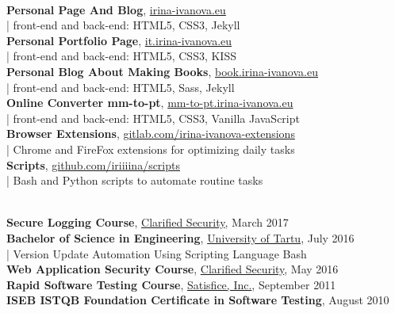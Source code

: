\documentclass[a4paper, 12pt]{article}
\begin{document}
\\
\textbf{Personal Page And Blog}, \href{https://irina-ivanova.eu}{irina-ivanova.eu}\\
\indent | front-end and back-end: HTML5, CSS3, Jekyll\\
\textbf{Personal Portfolio Page}, \href{https://it.irina-ivanova.eu}{it.irina-ivanova.eu}\\
\indent | front-end and back-end: HTML5, CSS3, KISS\\
\textbf{Personal Blog About Making Books}, \href{https://book.irina-ivanova.eu}{book.irina-ivanova.eu}\\
\indent | front-end and back-end: HTML5, Sass, Jekyll\\
\textbf{Online Converter mm-to-pt}, \href{https://mm-to-pt.irina-ivanova.eu}{mm-to-pt.irina-ivanova.eu}\\
\indent | front-end and back-end: HTML5, CSS3, Vanilla JavaScript\\
\textbf{Browser Extensions}, \href{https://gitlab.com/irina-ivanova-extensions}{gitlab.com/irina-ivanova-extensions}\\
\indent | Chrome and FireFox extensions for optimizing daily tasks\\
\textbf{Scripts}, \href{https://github.com/iriiiina/scripts}{github.com/iriiiina/scripts}\\
\indent | Bash and Python scripts to automate routine tasks\\

\pagestyle{empty}

\newpage

\\
\textbf{Secure Logging Course}, \href{https://clarifiedsecurity.com/secure-logging-training/}{Clarified Security}, March 2017\\
\textbf{Bachelor of Science in Engineering}, \href{https://www.ut.ee/en}{University of Tartu}, July 2016\\
\indent | Version Update Automation Using Scripting Language Bash\\
\textbf{Web Application Security Course}, \href{https://www.clarifiedsecurity.com/web-application-security-training/}{Clarified Security}, May 2016\\
\textbf{Rapid Software Testing Course}, \href{http://www.satisfice.com/info_rst.shtml}{Satisfice, Inc.}, September 2011\\
\textbf{ISEB ISTQB Foundation Certificate in Software Testing}, August 2010
\pagestyle{empty}
\end{document}
